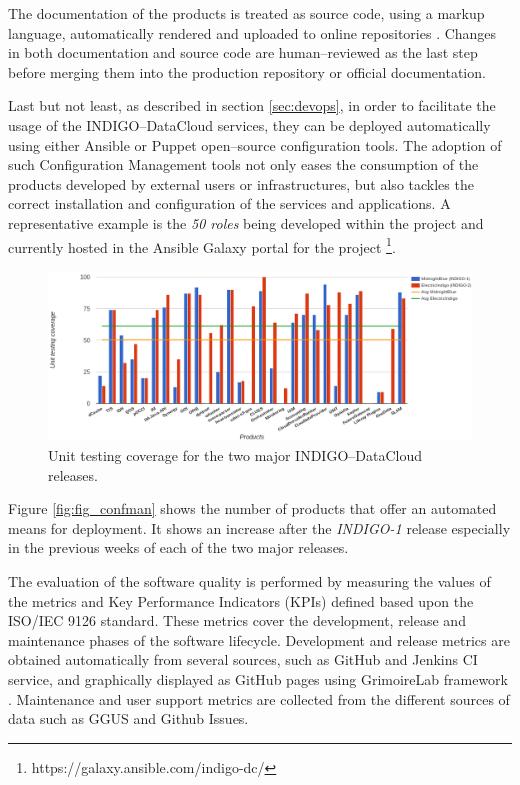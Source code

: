 \documentclass[journal]{IEEEtran}
\begin{document}
The documentation of the products is treated as source code, using a markup
language, automatically rendered and uploaded to online repositories
\cite{indigo-gitbook}. Changes in both documentation and source code are
human--reviewed as the last step before merging them into the production
repository or official documentation.

Last but not least, as described in section \ref{sec:devops}, in order
to facilitate the usage of the INDIGO--DataCloud services, they can be deployed
automatically using either Ansible \cite{indigo-ansible} or Puppet
\cite{indigo-puppet} open--source configuration tools. The adoption of such Configuration Management
tools not only eases the consumption of the products developed by external users or
infrastructures, but also tackles the correct installation and configuration of the
services and applications. A representative example is the \textit{50 roles} being 
developed within the project and currently hosted in the Ansible Galaxy portal for 
the project \footnote{https://galaxy.ansible.com/indigo-dc/}.

\begin{figure}[ht]
\centering
\includegraphics[width=\textwidth]{images/unittest.png}
\caption{Unit testing coverage for the two major INDIGO--DataCloud releases.}
\label{fig:fig_unittest}
\end{figure}

Figure \ref{fig:fig_confman} shows the number of products that offer an automated means
for deployment. It shows an increase after the {\sl INDIGO-1} release especially
in the previous weeks of each of the two major releases.

The evaluation of the software quality is performed by measuring the values of
the metrics and Key Performance Indicators (KPIs) defined based upon the
ISO/IEC 9126 standard. These metrics cover the development, release and
maintenance phases of the software lifecycle. Development and release metrics
are obtained automatically from several sources, such as GitHub and Jenkins CI
service, and graphically displayed as GitHub pages using GrimoireLab framework
\cite{grimoirelab}. Maintenance and user support metrics are collected from the
different sources of data such as GGUS \cite{ggus} and Github Issues.
\end{document}
